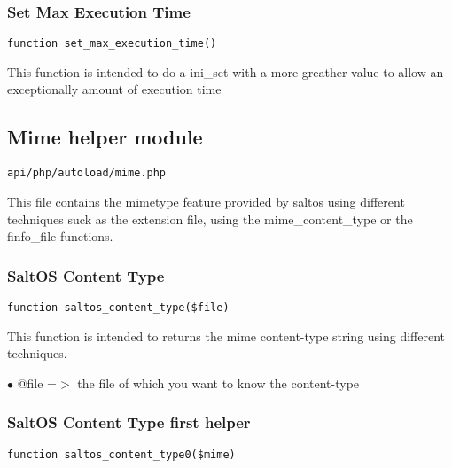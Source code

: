 \documentclass[a4paper]{article}
\begin{document}
\hypertarget{toc174}{}
\subsubsection{Set Max Execution Time}

\begin{lstlisting}
function set_max_execution_time()
\end{lstlisting}

This function is intended to do a ini\_set with a more greather value to allow an
exceptionally amount of execution time

\hypertarget{toc175}{}
\subsection{Mime helper module}

\begin{lstlisting}
api/php/autoload/mime.php
\end{lstlisting}

This file contains the mimetype feature provided by saltos using different techniques
suck as the extension file, using the mime\_content\_type or the finfo\_file functions.

\hypertarget{toc176}{}
\subsubsection{SaltOS Content Type}

\begin{lstlisting}
function saltos_content_type($file)
\end{lstlisting}

This function is intended to returns the mime content-type string using different
techniques.

\begin{compactitem}
\item[\color{myblue}$\bullet$] @file =$>$ the file of which you want to know the content-type
\end{compactitem}

\hypertarget{toc177}{}
\subsubsection{SaltOS Content Type first helper}

\begin{lstlisting}
function saltos_content_type0($mime)
\end{lstlisting}
\end{document}
